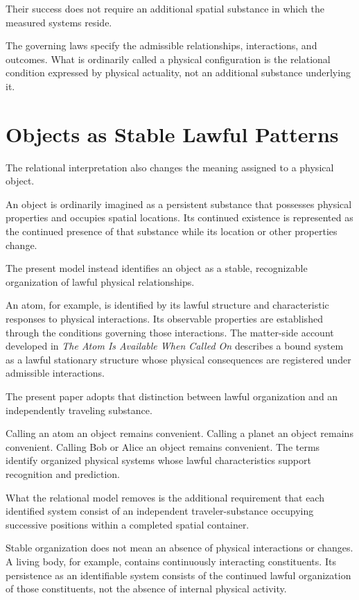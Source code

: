 \documentclass[12pt,onecolumn]{article}
\begin{document}
Their success does not require an additional spatial substance in which the measured systems reside.

The governing laws specify the admissible relationships, interactions, and outcomes. What is ordinarily called a physical configuration is the relational condition expressed by physical actuality, not an additional substance underlying it.

\section{Objects as Stable Lawful Patterns}

The relational interpretation also changes the meaning assigned to a physical object.

An object is ordinarily imagined as a persistent substance that possesses physical properties and occupies spatial locations. Its continued existence is represented as the continued presence of that substance while its location or other properties change.

The present model instead identifies an object as a stable, recognizable organization of lawful physical relationships.

An atom, for example, is identified by its lawful structure and characteristic responses to physical interactions. Its observable properties are established through the conditions governing those interactions. The matter-side account developed in \emph{The Atom Is Available When Called On} \cite{Atom} describes a bound system as a lawful stationary structure whose physical consequences are registered under admissible interactions.

The present paper adopts that distinction between lawful organization and an independently traveling substance.

Calling an atom an object remains convenient. Calling a planet an object remains convenient. Calling Bob or Alice an object remains convenient. The terms identify organized physical systems whose lawful characteristics support recognition and prediction.

What the relational model removes is the additional requirement that each identified system consist of an independent traveler-substance occupying successive positions within a completed spatial container.

Stable organization does not mean an absence of physical interactions or changes. A living body, for example, contains continuously interacting constituents. Its persistence as an identifiable system consists of the continued lawful organization of those constituents, not the absence of internal physical activity.
\end{document}
